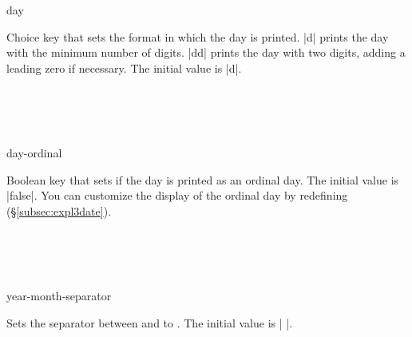 \documentclass{beerydoc}
\begin{document}
\begin{codedoc}{day}
  \begin{syntax}
  \end{syntax}
  Choice key that sets the format in which the day is printed.
  |d| prints the day with the minimum number of digits.
  |dd| prints the day with two digits, adding a leading zero if necessary.
  The initial value is |d|.
  \begin{codedemo}
    \\
    \\
    \\
  \end{codedemo}
\end{codedoc}

\begin{codedoc}{day-ordinal}
  \begin{syntax}
  \end{syntax}
  Boolean key that sets if the day is printed as an ordinal day.
  The initial value is |false|.
  You can customize the display of the ordinal day by redefining
   (\S\ref{subsec:expl3date}).
  \begin{codedemo}
    \\
    \\
    \\
  \end{codedemo}
\end{codedoc}

\begin{codedoc}{year-month-separator}
  \begin{syntax}
  \end{syntax}
  Sets the separator between  and  to .
  The initial value is | |.
  \begin{codedemo}
    \\
    \\
    \\
  \end{codedemo}
\end{codedoc}
\end{document}
